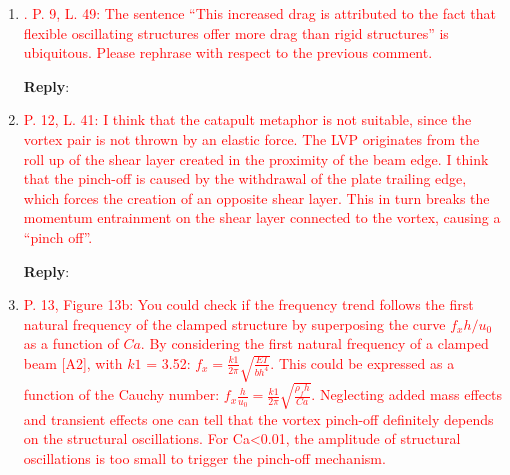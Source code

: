 \documentclass[onecolumn,a4paper,amsmath,amssym,pre]{revtex4}
\begin{document}
{\begin{enumerate}
	\textbf{Reply}:
	
	\item \textcolor{red}{. P. 9, L. 49: The sentence “This increased drag is attributed to the fact that flexible oscillating structures offer more drag than rigid structures” is ubiquitous. Please rephrase with respect to the previous comment.}
	
	\textbf{Reply}:
	
	\item \textcolor{red}{P. 12, L. 41: I think that the catapult metaphor is not suitable, since the vortex pair is not thrown by an elastic force. The LVP originates from the roll up of the shear layer created in the proximity of the beam edge. I think that the pinch-off is caused by the withdrawal of the plate trailing edge, which forces the creation of an opposite shear layer. This in turn breaks the momentum entrainment on the shear layer connected to the vortex, causing a “pinch off”.}
	
	\textbf{Reply}:
	
	\item \textcolor{red}{P. 13, Figure 13b: You could check if the frequency trend follows the first natural frequency of the clamped structure by superposing the curve $f_x h/u_0$ as a function of $Ca$. By considering the first natural frequency of a clamped beam [A2], with $k1$ = 3.52: $f_x=\frac{k1}{2\pi}\sqrt{\frac{EI}{bh^4}}$. This could be expressed as a function of the Cauchy number: $f_x\frac{h}{u_0}=\frac{k1}{2\pi}\sqrt{\frac{\rho_f h}{Ca}}$. Neglecting added mass effects and transient effects one can tell that the vortex pinch-off definitely depends on the structural oscillations. For Ca<0.01, the amplitude of structural oscillations is too small to trigger the pinch-off mechanism.}\\
	
		\\
	\color{black}{
		
}
\end{enumerate}}
\end{document}
